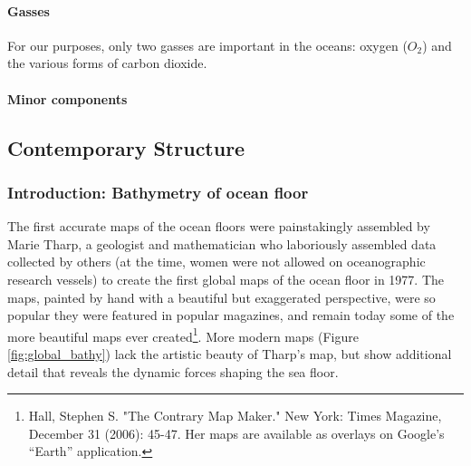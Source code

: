 \documentclass[amstex,12pt]{book}
\begin{document}
\paragraph{Gasses}
For our purposes, only two gasses are important in the oceans: oxygen ($O_2$) and the various forms of carbon dioxide. 
\paragraph{Minor components}

\subsection{Contemporary Structure}
\subsubsection{Introduction: Bathymetry of ocean floor}
The first accurate maps of the ocean floors were painstakingly assembled by Marie Tharp, a geologist and mathematician who laboriously assembled data collected by others (at the time, women were not allowed on oceanographic research vessels) to create the first global maps of the ocean floor in 1977. The maps, painted by hand with a beautiful but exaggerated perspective, were so popular they were featured in popular magazines, and remain today some of the more beautiful maps ever created\footnote{Hall, Stephen S. "The Contrary Map Maker." New York: Times Magazine, December 31 (2006): 45-47. Her maps are available as overlays on Google's ``Earth'' application.}. More modern maps (Figure \ref{fig:global_bathy}) lack the artistic beauty of Tharp's map, but show additional detail that reveals the dynamic forces shaping the sea floor.\\
\end{document}
